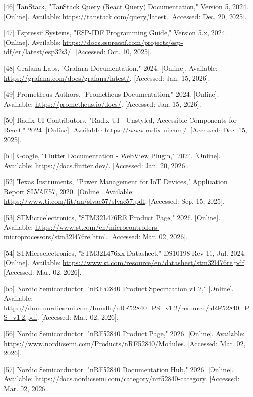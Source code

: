 \documentclass[a4paper]{extarticle}
\begin{document}
{[}46{]} TanStack, "TanStack Query (React Query) Documentation," Version
5, 2024. {[}Online{]}. Available:
\url{https://tanstack.com/query/latest}. {[}Accessed: Dec. 20, 2025{]}.

{[}47{]} Espressif Systems, "ESP-IDF Programming Guide," Version 5.x,
2024. {[}Online{]}. Available:
\url{https://docs.espressif.com/projects/esp-idf/en/latest/esp32s3/}.
{[}Accessed: Oct. 10, 2025{]}.

{[}48{]} Grafana Labs, "Grafana Documentation," 2024. {[}Online{]}.
Available: \url{https://grafana.com/docs/grafana/latest/}. {[}Accessed:
Jan. 15, 2026{]}.

{[}49{]} Prometheus Authors, "Prometheus Documentation," 2024.
{[}Online{]}. Available: \url{https://prometheus.io/docs/}. {[}Accessed:
Jan. 15, 2026{]}.

{[}50{]} Radix UI Contributors, "Radix UI - Unstyled, Accessible
Components for React," 2024. {[}Online{]}. Available:
\url{https://www.radix-ui.com/}. {[}Accessed: Dec. 15, 2025{]}.

{[}51{]} Google, "Flutter Documentation - WebView Plugin," 2024.
{[}Online{]}. Available: \url{https://docs.flutter.dev/}. {[}Accessed:
Jan. 20, 2026{]}.

{[}52{]} Texas Instruments, "Power Management for IoT Devices,"
Application Report SLVAE57, 2020. {[}Online{]}. Available:
\url{https://www.ti.com/lit/an/slvae57/slvae57.pdf}. {[}Accessed: Sep.
15, 2025{]}.

{[}53{]} STMicroelectronics, "STM32L476RE Product Page," 2026.
{[}Online{]}. Available:
\url{https://www.st.com/en/microcontrollers-microprocessors/stm32l476re.html}.
{[}Accessed: Mar. 02, 2026{]}.

{[}54{]} STMicroelectronics, "STM32L476xx Datasheet," DS10198 Rev 11,
Jul. 2024. {[}Online{]}. Available:
\url{https://www.st.com/resource/en/datasheet/stm32l476re.pdf}.
{[}Accessed: Mar. 02, 2026{]}.

{[}55{]} Nordic Semiconductor, "nRF52840 Product Specification v1.2,"
{[}Online{]}. Available:
\url{https://docs.nordicsemi.com/bundle/nRF52840_PS_v1.2/resource/nRF52840_PS_v1.2.pdf}.
{[}Accessed: Mar. 02, 2026{]}.

{[}56{]} Nordic Semiconductor, "nRF52840 Product Page," 2026.
{[}Online{]}. Available:
\url{https://www.nordicsemi.com/Products/nRF52840/Modules}. {[}Accessed:
Mar. 02, 2026{]}.

{[}57{]} Nordic Semiconductor, "nRF52840 Documentation Hub," 2026.
{[}Online{]}. Available:
\url{https://docs.nordicsemi.com/category/nrf52840-category}.
{[}Accessed: Mar. 02, 2026{]}.
\end{document}
